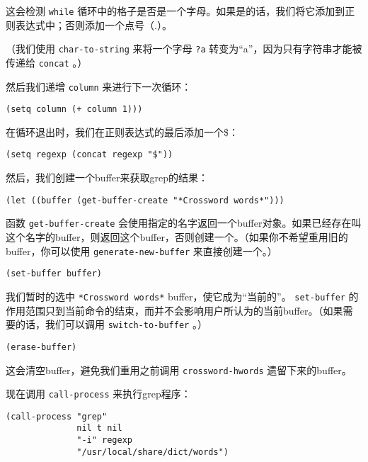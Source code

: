 这会检测 \texttt{while} 循环中的格子是否是一个字母。如果是的话，我们将它添加到正则表达式中；否则添加一个点号（.）。

（我们使用 \texttt{char-to-string} 来将一个字母 \texttt{?a} 转变为“a”，因为只有字符串才能被传递给 \texttt{concat} 。）

然后我们递增 \texttt{column} 来进行下一次循环：

\begin{verbatim}
(setq column (+ column 1)))
\end{verbatim}

在循环退出时，我们在正则表达式的最后添加一个\$：

\begin{verbatim}
(setq regexp (concat regexp "$"))
\end{verbatim}

然后，我们创建一个buffer来获取grep的结果：

\begin{verbatim}
(let ((buffer (get-buffer-create "*Crossword words*")))
\end{verbatim}

函数 \texttt{get-buffer-create} 会使用指定的名字返回一个buffer对象。如果已经存在叫这个名字的buffer，则返回这个buffer，否则创建一个。（如果你不希望重用旧的buffer，你可以使用 \texttt{generate-new-buffer} 来直接创建一个。）

\begin{verbatim}
(set-buffer buffer)
\end{verbatim}

我们暂时的选中 \texttt{*Crossword words*} buffer，使它成为“当前的”。 \texttt{set-buffer} 的作用范围只到当前命令的结束，而并不会影响用户所认为的当前buffer。（如果需要的话，我们可以调用 \texttt{switch-to-buffer} 。）

\begin{verbatim}
(erase-buffer)
\end{verbatim}

这会清空buffer，避免我们重用之前调用 \texttt{crossword-hwords} 遗留下来的buffer。

现在调用 \texttt{call-process} 来执行grep程序：

\begin{verbatim}
(call-process "grep"
              nil t nil
              "-i" regexp
              "/usr/local/share/dict/words")
\end{verbatim}

